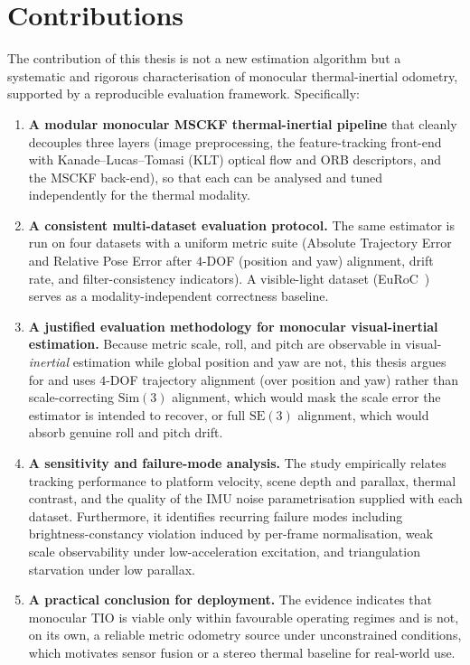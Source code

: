 \section{Contributions}
\label{sec:contributions}

The contribution of this thesis is not a new estimation algorithm but a systematic and rigorous characterisation of monocular thermal-inertial odometry, supported by a reproducible evaluation framework. Specifically:
%
\begin{enumerate}
  \item \textbf{A modular monocular MSCKF thermal-inertial pipeline} that cleanly decouples three layers (image preprocessing, the feature-tracking front-end with Kanade--Lucas--Tomasi (KLT) optical flow and ORB descriptors, and the MSCKF back-end), so that each can be analysed and tuned independently for the thermal modality.
  \item \textbf{A consistent multi-dataset evaluation protocol.} The same estimator is run on four datasets with a uniform metric suite (Absolute Trajectory Error and Relative Pose Error after $4$-DOF (position and yaw) alignment, drift rate, and filter-consistency indicators). A visible-light dataset (EuRoC~\cite{Burri_2016}) serves as a modality-independent correctness baseline.
  \item \textbf{A justified evaluation methodology for monocular visual-inertial estimation.} Because metric scale, roll, and pitch are observable in visual-\emph{inertial} estimation while global position and yaw are not, this thesis argues for and uses $4$-DOF trajectory alignment (over position and yaw) rather than scale-correcting $\mathrm{Sim}(3)$ alignment, which would mask the scale error the estimator is intended to recover, or full $\mathrm{SE}(3)$ alignment, which would absorb genuine roll and pitch drift.
  \item \textbf{A sensitivity and failure-mode analysis.} The study empirically relates tracking performance to platform velocity, scene depth and parallax, thermal contrast, and the quality of the IMU noise parametrisation supplied with each dataset. Furthermore, it identifies recurring failure modes including brightness-constancy violation induced by per-frame normalisation, weak scale observability under low-acceleration excitation, and triangulation starvation under low parallax.
  \item \textbf{A practical conclusion for deployment.} The evidence indicates that monocular TIO is viable only within favourable operating regimes and is not, on its own, a reliable metric odometry source under unconstrained conditions, which motivates sensor fusion or a stereo thermal baseline for real-world use.
\end{enumerate}

